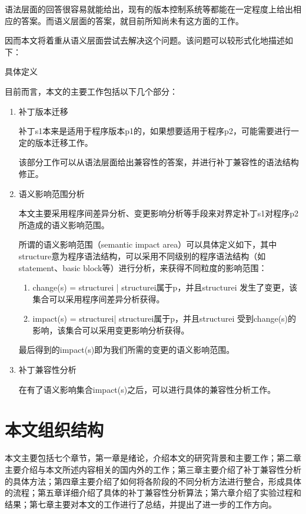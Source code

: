 语法层面的回答很容易就能给出，现有的版本控制系统等都能在一定程度上给出相应的答案。而语义层面的答案，就目前所知尚未有这方面的工作。

因而本文将着重从语义层面尝试去解决这个问题。该问题可以较形式化地描述如下：

\begin{problem}
	具体定义
\end{problem}

目前而言，本文的主要工作包括以下几个部分：

\begin{enumerate}
	\item
	补丁版本迁移

补丁s1本来是适用于程序版本p1的，如果想要适用于程序p2，可能需要进行一定的版本迁移工作。

该部分工作可以从语法层面给出兼容性的答案，并进行补丁兼容性的语法结构修正。

	\item
	语义影响范围分析

本文主要采用程序间差异分析、变更影响分析等手段来对界定补丁s1对程序p2所造成的语义影响范围。

所谓的语义影响范围（semantic impact area）可以具体定义如下，其中structure意为程序语法结构，可以采用不同级别的程序语法结构（如statement、basic block等）进行分析，来获得不同粒度的影响范围：
	\begin{enumerate}
		\item
		change(s) = { structurei | structurei属于p，并且structurei 发生了变更}，该集合可以采用程序间差异分析获得。
		
		\item
		impact(s) = {structurei| structurei属于p，并且structurei 受到change(s)的影响}，该集合可以采用变更影响分析获得。
		
	\end{enumerate}
最后得到的impact(s)即为我们所需的变更的语义影响范围。

	\item
	补丁兼容性分析

在有了语义影响集合impact(s)之后，可以进行具体的兼容性分析工作。
\end{enumerate}

\section{本文组织结构}

本文主要包括七个章节，第一章是绪论，介绍本文的研究背景和主要工作；第二章主要介绍与本文所述内容相关的国内外的工作；第三章主要介绍了补丁兼容性分析的具体方法；第四章主要介绍了如何将各阶段的不同分析方法进行整合，形成具体的流程；第五章详细介绍了具体的补丁兼容性分析算法；第六章介绍了实验过程和结果；第七章主要对本文的工作进行了总结，并提出了进一步的工作方向。


